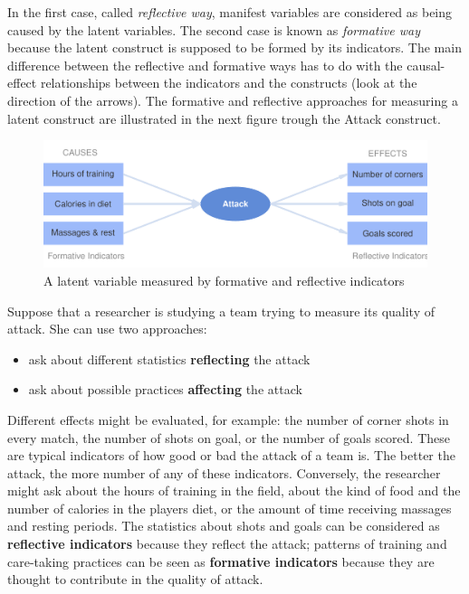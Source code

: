 \documentclass[12pt]{book}\usepackage{graphicx, color}
\newenvironment{knitrout}{}{} %
\begin{document}
In the first case, called \textit{reflective way}, manifest variables are considered as being caused by the latent variables. The second case is known as \textit{formative way} because the latent construct is supposed to be formed by its indicators. The main difference between the reflective and formative ways has to do with the causal-effect relationships between the indicators and the constructs (look at the direction of the arrows). The formative and reflective approaches for measuring a latent construct are illustrated in the next figure trough the Attack construct.




\begin{knitrout}
\color{fgcolor}\begin{figure}[h]


{\centering \includegraphics[width=.9\linewidth,height=.35\linewidth]{figure/measure_success_diagram} 

}

\caption[A latent variable measured by formative and reflective indicators]{A latent variable measured by formative and reflective indicators\label{fig:measure_success_diagram}}
\end{figure}


\end{knitrout}


Suppose that a researcher is studying a team trying to measure its quality of attack. She can use two approaches:
\begin{itemize}
 \item ask about different statistics \textbf{reflecting} the attack
 \item ask about possible practices \textbf{affecting} the attack 
\end{itemize}

Different effects might be evaluated, for example: the number of corner shots in every match, the number of shots on goal, or the number of goals scored. These are typical indicators of how good or bad the attack of a team is. The better the attack, the more number of any of these indicators. Conversely, the researcher might ask about the hours of training in the field, about the kind of food and the number of calories in the players diet, or the amount of time receiving massages and resting periods. The statistics about shots and goals can be considered as \textbf{reflective indicators} because they reflect the attack; patterns of training and care-taking practices can be seen as \textbf{formative indicators} because they are thought to contribute in the quality of attack. 
\end{document}
